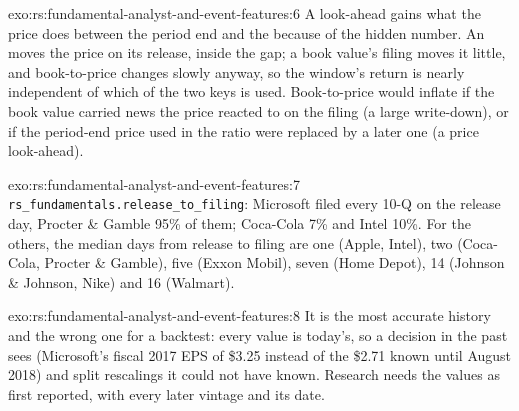 \begin{solution}{exo:rs:fundamental-analyst-and-event-features:6}
A look-ahead gains what the price does between the period end and the  because of the hidden number. An  moves the
price on its release, inside the gap; a book value's filing moves it little, and book-to-price changes slowly anyway, so the window's return is
nearly independent of which of the two keys is used. Book-to-price would inflate if the book value carried news the price reacted to on the filing
(a large write-down), or if the period-end price used in the ratio were replaced by a later one (a price look-ahead).
\end{solution}

\begin{solution}{exo:rs:fundamental-analyst-and-event-features:7}
\texttt{rs\_fundamentals.release\_to\_filing}: Microsoft filed every 10-Q on the release day, Procter \& Gamble 95\% of them; Coca-Cola 7\% and
Intel 10\%. For the others, the median days from release to filing are one (Apple, Intel), two (Coca-Cola, Procter \& Gamble), five (Exxon Mobil),
seven (Home Depot), 14 (Johnson \& Johnson, Nike) and 16 (Walmart).
\end{solution}

\begin{solution}{exo:rs:fundamental-analyst-and-event-features:8}
It is the most accurate history and the wrong one for a backtest: every value is today's, so a decision in the past sees  (Microsoft's
fiscal 2017 EPS of \$3.25 instead of the \$2.71 known until August 2018) and split rescalings it could not have known. Research needs the values as
first reported, with every later vintage and its date.
\end{solution}

